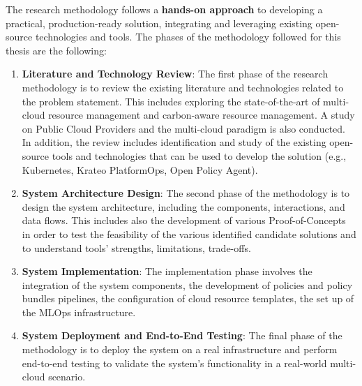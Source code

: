 


The research methodology follows a \textbf{hands-on approach} to developing a practical, production-ready solution, integrating and leveraging existing open-source technologies and tools.
The phases of the methodology followed for this thesis are the following:
\begin{enumerate}
    \item \textbf{Literature and Technology Review}: The first phase of the research methodology is to review the existing literature and technologies related to the problem statement. 
    This includes exploring the state-of-the-art of multi-cloud resource management and carbon-aware resource management.
    A study on Public Cloud Providers and the multi-cloud paradigm is also conducted.
    In addition, the review includes identification and study of the existing open-source tools and technologies that can be used to develop the solution (e.g., Kubernetes, Krateo PlatformOps, Open Policy Agent).
    \item \textbf{System Architecture Design}: The second phase of the methodology is to design the system architecture, including the components, interactions, and data flows.
    This includes also the development of various Proof-of-Concepts in order to test the feasibility of the various identified candidate solutions and to understand tools' strengths, limitations, trade-offs.
    \item \textbf{System Implementation}: The implementation phase involves the integration of the system components, the development of policies and policy bundles pipelines, the configuration of cloud resource templates, the set up of the MLOps infrastructure.
    \item \textbf{System Deployment and End-to-End Testing}: The final phase of the methodology is to deploy the system on a real infrastructure and perform end-to-end testing to validate the system's functionality in a real-world multi-cloud scenario. \newline
\end{enumerate}



